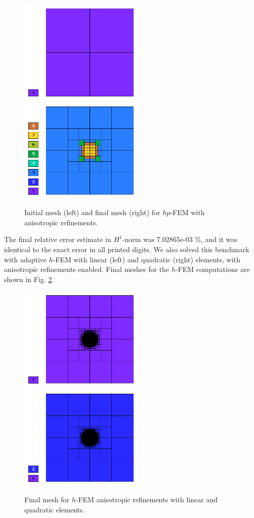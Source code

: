 \begin{figure}[!ht]
\centering
\includegraphics[height=5cm]{nist/nist-4/mesh_hp_aniso_init.png}\ \
\includegraphics[height=5cm]{nist/nist-4/mesh_hp_aniso.png}
\caption{Initial mesh (left) and final mesh (right) for $hp$-FEM with anisotropic refinements.}
\label{fig:nist-4-hp-aniso}
\end{figure}

The final relative error estimate in $H^1$-norm was 7.02865e-03 \%,
and it was identical to the exact error in all printed digits.
We also solved this benchmark with adaptive $h$-FEM
with linear (left) and quadratic (right)
elements, with anisotropic refinements enabled.
Final meshes for the $h$-FEM computations are shown
in Fig. \ref{fig:nist-4-h-aniso}.

\begin{figure}[!ht]
\centering
\includegraphics[height=5cm]{nist/nist-4/mesh_h1_aniso.png}\ \
\includegraphics[height=5cm]{nist/nist-4/mesh_h2_aniso.png}
\caption{Final mesh for $h$-FEM anisotropic refinements with linear and quadratic elements.}
\label{fig:nist-4-h-aniso}
\end{figure}

